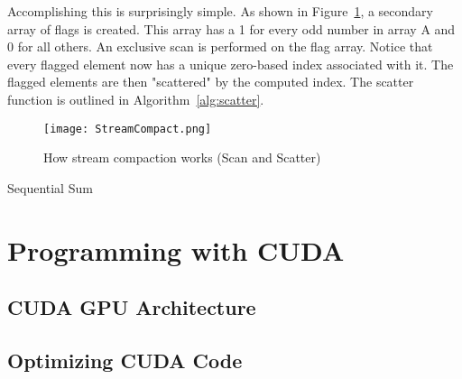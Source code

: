 Accomplishing this is surprisingly simple. As shown in Figure~\ref{fig:streamcompact}, a secondary array of flags is created. This array has a 1 for every odd number in array A and 0 for all others. An exclusive scan is performed on the flag array. Notice that every flagged element now has a unique zero-based index associated with it. The flagged elements are then "scattered" by the computed index. The scatter function is outlined in Algorithm~\ref{alg:scatter}.

\begin{figure}[h]
    \centering
    \texttt{[image: StreamCompact.png]}
    \caption{How stream compaction works (Scan and Scatter)}
    \label{fig:streamcompact}
\end{figure}


\begin{algorithm}[H]
\label{alg:scatter}
 \singlespacing
 \caption{Sequential Sum}
\end{algorithm}

\section{Programming with CUDA}
\subsection{CUDA GPU Architecture}
\subsection{Optimizing CUDA Code}
